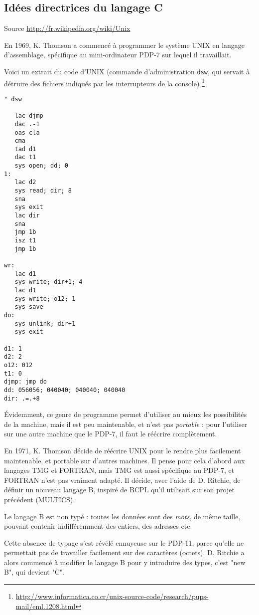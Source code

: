 \documentclass[10pt]{article}
\begin{document}
\subsection{Idées directrices du langage C}

Source \url{http://fr.wikipedia.org/wiki/Unix}

En 1969, K. Thomson a commencé à programmer le système UNIX en langage
d'assemblage, spécifique au mini-ordinateur PDP-7 sur lequel il
travaillait.

Voici un extrait du code d'UNIX (commande d'administration
\texttt{dsw}, qui servait à détruire des fichiers indiqués par les
interrupteurs de la console)
\footnote{
\url{http://www.informatica.co.cr/unix-source-code/research/pups-mail/eml.1208.html}
}
\begin{multicols}{2}
\small
\begin{lstlisting}[frame=single]
" dsw

   lac djmp
   dac .-1
   oas cla
   cma
   tad d1
   dac t1
   sys open; dd; 0
1:
   lac d2
   sys read; dir; 8
   sna
   sys exit
   lac dir
   sna
   jmp 1b
   isz t1
   jmp 1b

wr:
   lac d1
   sys write; dir+1; 4
   lac d1
   sys write; o12; 1
   sys save
do:
   sys unlink; dir+1
   sys exit

d1: 1
d2: 2
o12: 012
t1: 0
djmp: jmp do
dd: 056056; 040040; 040040; 040040
dir: .=.+8
\end{lstlisting}
\end{multicols}

Évidemment, ce genre de programme permet d'utiliser au mieux les
possibilités de la machine, mais il est peu maintenable, et n'est pas
\emph{portable} : pour l'utiliser sur une autre machine que le PDP-7, il faut
le réécrire complètement.

En 1971, K. Thomson décide de réécrire UNIX pour le rendre plus
facilement maintenable, et portable sur d'autres machines. Il pense
pour cela d'abord aux langages TMG et FORTRAN, mais TMG est aussi
spécifique au PDP-7, et FORTRAN n'est pas vraiment adapté. Il décide,
avec l'aide de D. Ritchie, de définir un nouveau langage B, inspiré de
BCPL qu'il utilisait sur son projet précédent (MULTICS).

Le langage B est non typé : toutes les données sont des \emph{mots},
de même taille, pouvant contenir indifféremment des entiers, des
adresses etc.

Cette absence de typage s'est révélé ennuyeuse sur le PDP-11, parce qu'elle
ne permettait pas de travailler facilement sur des caractères (octets).
D. Ritchie a alors commencé à modifier le langage B pour y introduire des
types, c'est "new B", qui devient "C".  
\end{document}
